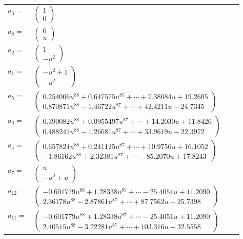 \documentclass[1p]{elsarticle_modified}
\theoremstyle{definition}
\begin{document}
\begin{tabular}{m{7pt} m{180pt} m{7pt} m{180pt} }
\flushright $a_{3}=$&$\begin{pmatrix}1\\0\end{pmatrix}$ \\
\flushright $a_{8}=$&$\begin{pmatrix}0\\u\end{pmatrix}$ \\
\flushright $a_{2}=$&$\begin{pmatrix}1\\- u^2\end{pmatrix}$ \\
\flushright $a_{1}=$&$\begin{pmatrix}- u^2+1\\- u^2\end{pmatrix}$ \\
\flushright $a_{5}=$&$\begin{pmatrix}0.254006 u^{88}+0.647575 u^{87}+\cdots+7.38084 u+19.2605\\0.870871 u^{88}-1.46722 u^{87}+\cdots+42.4211 u-24.7345\end{pmatrix}$ \\
\flushright $a_{6}=$&$\begin{pmatrix}0.390082 u^{88}+0.0955497 u^{87}+\cdots+14.2030 u+11.8426\\0.488241 u^{88}-1.26681 u^{87}+\cdots+33.9619 u-22.3972\end{pmatrix}$ \\
\flushright $a_{4}=$&$\begin{pmatrix}0.657824 u^{88}+0.241125 u^{87}+\cdots+10.9756 u+16.1052\\-1.86162 u^{88}+2.32381 u^{87}+\cdots-85.2070 u+17.8243\end{pmatrix}$ \\
\flushright $a_{7}=$&$\begin{pmatrix}u\\- u^3+u\end{pmatrix}$ \\
\flushright $a_{12}=$&$\begin{pmatrix}-0.601779 u^{88}+1.28338 u^{87}+\cdots-25.4051 u+11.2090\\2.36178 u^{88}-2.87861 u^{87}+\cdots+87.7562 u-25.7398\end{pmatrix}$ \\
\flushright $a_{11}=$&$\begin{pmatrix}-0.601779 u^{88}+1.28338 u^{87}+\cdots-25.4051 u+11.2090\\2.40515 u^{88}-3.22281 u^{87}+\cdots+103.316 u-32.5558\end{pmatrix}$ \\

\end{tabular}
\end{document}
